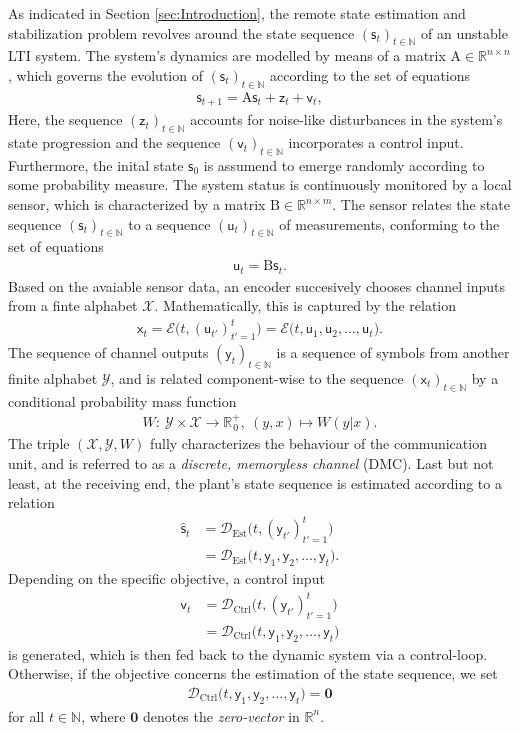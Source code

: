 \documentclass[conference]{IEEEtran}
\newcommand{\rx}{\mathsf{x}}
\newcommand{\ry}{\mathsf{y}}
\newcommand{\rs}{\mathsf{s}}
\newcommand{\rz}{\mathsf{z}}
\newcommand{\ru}{\mathsf{u}}
\newcommand{\rv}{\mathsf{v}}
\newcommand{\rus}{(\mathsf{u}_t)_{t\in\NN}}
\newcommand{\rvs}{(\mathsf{v}_t)_{t\in\NN}}
\def\E{{\mathcal E}}
\def\D{{\mathcal D}}
\def\X{{\mathcal X}}
\def\Y{{\mathcal Y}}
\def\NN{{\mathbb N}}
\def\RR{{\mathbb R}}
\def\mA{\bm{\mathrm{A}}}
\def\mB{\bm{\mathrm{B}}}
\newcommand{\De}{\D_{\text{Est}}}
\newcommand{\Dc}{\D_{\text{Ctrl}}}
\begin{document}
	As indicated in Section \ref{sec:Introduction}, 
	the remote state estimation and stabilization problem revolves around the state sequence \((\rs_t)_{t\in\NN}\) 
	of an unstable LTI system. The system's dynamics are modelled by means of a matrix \(\mA \in \RR^{n\times n}\), which governs the evolution of \((\rs_t)_{t\in\NN}\) 
	according to the set of equations 
	\begin{align*}	 \rs_{t+1}    	= \mA \rs_t + \rz_t + \rv_t, 
	\end{align*}
	Here, the sequence \((\rz_t)_{t\in\NN}\) accounts for noise-like disturbances in the system's state progression and the sequence \(\rvs\) incorporates a control input. 
	Furthermore, the inital state \(\rs_0\) is assumend to emerge randomly according to some probability measure. 
	The system status is continuously monitored by a local sensor, which is characterized by a matrix \(\mB\in\RR^{n\times m}\). The sensor relates the
	state sequence \((\rs_t)_{t\in\NN}\) to a sequence \(\rus\) of measurements, conforming to the set of equations
	\begin{align*}	\ru_t    = \mB \rs_t.
	\end{align*}  	
	Based on the avaiable sensor data, an encoder succesively chooses channel inputs from a finte alphabet \(\X\). Mathematically, this is captured by the relation
	\begin{align*}	\rx_t   = \E \big(t, (\ru_{t'})_{t'=1}^{t}\big) 							= \E\big(t, \ru_1,\ru_2,\ldots,\ru_t\big).
	\end{align*}
	The sequence of channel outputs \((\ry_t)_{t\in\NN}\) is a sequence
	of symbols from another finite alphabet \(\Y\), and is related component-wise to the sequence \((\rx_t)_{t\in\NN}\) by a conditional probability mass function
	\begin{align*}	W :~ \Y \times \X \rightarrow \RR_{\hspace{1pt}0}^+,~(y,x) \mapsto W(y|x).
	\end{align*}
	The triple \((\X,\Y,W)\) fully characterizes the behaviour of the communication unit, and is referred to as a \emph{discrete, memoryless channel} (DMC).
	Last but not least, at the receiving end, the plant's state sequence is estimated according to a relation
	\begin{align*}	\hat{\rs}_t  	&= \De\big(t, (\ry_{t'})_{t'=1}^{t}\big)  \\
									&= \De\big(t,\ry_1,\ry_2,\ldots,\ry_t\big).
	\end{align*}
	Depending on the specific objective, a control input 
	\begin{align*}	\rv_t  			&= \Dc\big(t, (\ry_{t'})_{t'=1}^{t}\big)  \\
									&= \Dc\big(t,\ry_1,\ry_2,\ldots,\ry_t\big)
	\end{align*}
	is generated, which is then fed back to the dynamic system via a control-loop. Otherwise, if the objective concerns the estimation
	of the state sequence, we set
	\begin{align}	\label{eq:No_Ctrl_Loop}
					\Dc\big(t,\ry_1,\ry_2,\ldots,\ry_t\big) = \bm{0}
	\end{align}
	for all \(t\in\NN\), where \(\bm{0}\) denotes the \emph{zero-vector} in \(\RR^{n}\). 
	 
\end{document}
